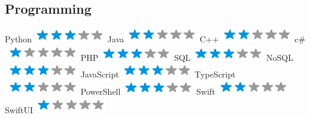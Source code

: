 \begin{aside}
    \section{Programming}
      Python\includegraphics[scale=0.40]{img/3stars.png}
      Java\includegraphics[scale=0.40]{img/2stars.png}
      C++\includegraphics[scale=0.40]{img/2stars.png}
      c\#\includegraphics[scale=0.40]{img/1stars.png}
      PHP\includegraphics[scale=0.40]{img/3stars.png}
      SQL\includegraphics[scale=0.40]{img/3stars.png}
      NoSQL\includegraphics[scale=0.40]{img/3stars.png}
      JavaScript\includegraphics[scale=0.40]{img/3stars.png}
      TypeScript\includegraphics[scale=0.40]{img/2stars.png}
      PowerShell\includegraphics[scale=0.40]{img/3stars.png}
      Swift\includegraphics[scale=0.40]{img/2stars.png}
      SwiftUI\includegraphics[scale=0.40]{img/1stars.png}

\end{aside}
